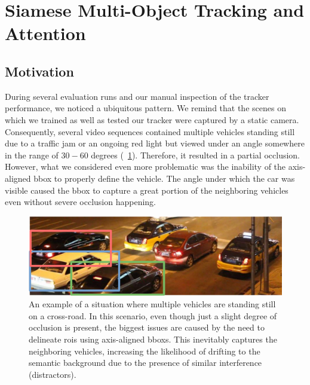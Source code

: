 \section{Siamese Multi-Object Tracking and Attention}
\label{sec:SiamMOTandAttention}

\subsection{Motivation}

During several evaluation runs and our manual inspection of the tracker performance, we noticed a ubiquitous pattern. We remind that the scenes on which we trained as well as tested our tracker were captured by a static camera. Consequently, several video sequences contained multiple vehicles standing still due to a traffic jam or an ongoing red light but viewed under an angle somewhere in the range of $30-60$ degrees (\figtext{}~\ref{fig:UADETRACPartialOcclusion}). Therefore, it resulted in a partial occlusion. However, what we considered even more problematic was the inability of the axis-aligned \gls{bbox} to properly define the vehicle. The angle under which the car was visible caused the \gls{bbox} to capture a great portion of the neighboring vehicles even without severe occlusion happening.

\begin{figure}[!t]
    \centerline{\includegraphics[width=0.7\linewidth]{figures/siamese_tracking/uadetrac_partial_occlusion_red_light.pdf}}
    \caption[Partial occlusion in the \uadetrac{} dataset]{An example of a situation where multiple vehicles are standing still on a cross-road. In this scenario, even though just a slight degree of occlusion is present, the biggest issues are caused by the need to delineate \glspl{roi} using axis-aligned \glspl{bbox}. This inevitably captures the neighboring vehicles, increasing the likelihood of drifting to the semantic background due to the presence of similar interference (distractors).}
    \label{fig:UADETRACPartialOcclusion}
\end{figure}

